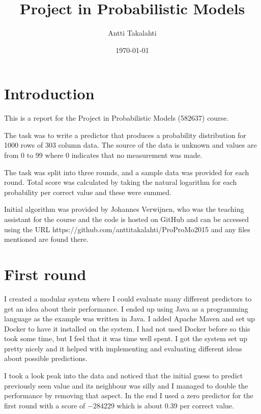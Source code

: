 \documentclass[english,12pt]{tktltiki2}
\title{Project in Probabilistic Models}
\author{Antti Takalahti}
\date{\today}
\theoremstyle{definition}
\theoremstyle{remark}
\begin{document}

\frontmatter      %

\maketitle        %

\tableofcontents  %


\mainmatter       %

\section{Introduction}

This is a report for the Project in Probabilistic Models (582637) course. 

The task was to write a predictor that produces a probability distribution for 1000 rows of 303 column data. The source of the data is unknown and values are from 0 to 99 where 0 indicates that no measurement was made.

The task was split into three rounds, and a sample data was provided for each round. Total score was calculated by taking the natural logarithm for each probability per correct value and these were summed.

Initial algorithm was provided by Johannes Verwijnen, who was the teaching assistant for the course and the code is hosted on GitHub and can be accessed using the URL https://github.com/anttitakalahti/ProProMo2015 and any files mentioned are found there.

\section{First round}

I created a modular system where I could evaluate many different predictors to get an idea about their performance. I ended up using Java as a programming language as the example was written in Java. I added Apache Maven and set up Docker to have it installed on the system. I had not used Docker before so this took some time, but I feel that it was time well spent. I got the system set up pretty nicely and it helped with implementing and evaluating different ideas about possible predictions.

I took a look peak into the data and noticed that the initial guess to predict previously seen value and its neighbour was silly and I managed to double the performance by removing that aspect. In the end I used a zero predictor for the first round with a score of \num{-284229} which is about 0.39 per correct value.
\end{document}
